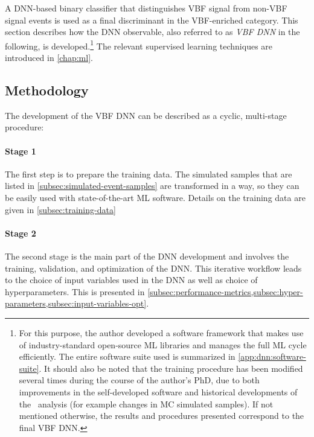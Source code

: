 A DNN-based binary classifier that distinguishes VBF signal from non-VBF signal events is used as a final discriminant in the VBF-enriched \TwoJet category.
This section describes how the DNN observable, also referred to as \emph{VBF DNN} in the following, is developed.\footnote{For this purpose, the author developed a software framework that makes use of industry-standard open-source ML libraries and manages the full ML cycle efficiently.
    The entire software suite used is summarized in \cref{app:dnn:software-suite}.
    It should also be noted that the training procedure has been modified several times during the course of the author's PhD, due to both improvements in the self-developed software and historical developments of the \HWW\ analysis (for example changes in MC simulated samples). If not mentioned otherwise, the results and procedures presented correspond to the final VBF DNN.}
The relevant supervised learning techniques are introduced in \cref{chap:ml}.



\subsection{Methodology}
The development of the VBF DNN can be described as a cyclic, multi-stage procedure:

\paragraph{Stage 1}
The first step is to prepare the training data.
The simulated samples that are listed in \cref{subsec:simulated-event-samples} are transformed in a way, so they can be easily used with state-of-the-art ML software. Details on the training data are given in \cref{subsec:training-data}

\paragraph{Stage 2}
The second stage is the main part of the DNN development and involves the training, validation, and optimization of the DNN.
This iterative workflow leads to the choice of input variables used in the DNN as well as choice of hyperparameters. This is presented in \cref{subsec:performance-metrics,subsec:hyper-parameters,subsec:input-variables-opt}.

